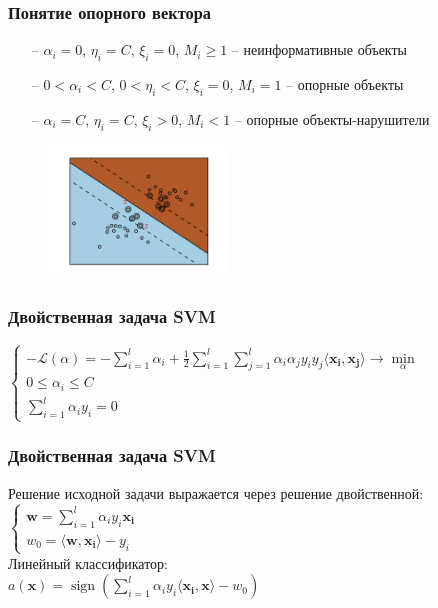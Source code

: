 \documentclass[12pt]{beamer}
\DeclareMathOperator{\sign}{sign}
\begin{document}
\begin{frame}\frametitle{Понятие опорного вектора}
\begin{itemize}
\item[--] $\alpha_i = 0$, $\eta_i = C$, $\xi_i = 0$, $M_i \geq 1$ -- неинформативные объекты
\item[--] $0 < \alpha_i < C$, $0 < \eta_i < C$, $\xi_i = 0$, $M_i = 1$ -- опорные объекты
\item[--] $\alpha_i = C$, $\eta_i = C$, $\xi_i > 0$, $M_i < 1$ -- опорные объекты-нарушители
\end{itemize}

\begin{figure}[htbp]
  \includegraphics[height=100pt, keepaspectratio = true]{images/classification}   
\end{figure}

\end{frame}


\begin{frame}\frametitle{Двойственная задача SVM}
$\begin{cases}
-\mathcal{L}(\alpha) = - \sum\limits_{i = 1}^l \alpha_i  + \frac{1}{2} \sum\limits_{i = 1}^l\sum\limits_{j = 1}^l \alpha_i \alpha_j y_iy_j \langle \mathbf{x_i}, \mathbf{x_j} \rangle \rightarrow \min\limits_{\alpha}\\
0 \leq \alpha_i \leq C\\
\sum\limits_{i=1}^l \alpha_iy_i = 0
\end{cases}$\\
\end{frame}

\begin{frame}\frametitle{Двойственная задача SVM}

Решение исходной задачи выражается через решение двойственной:\\
$\begin{cases}
\mathbf{w} = \sum\limits_{i = 1}^l \alpha_iy_i\mathbf{x_i}\\
w_0 = \langle \mathbf{w}, \mathbf{x_i} \rangle - y_i
\end{cases}$\\
\vspace{5mm}
Линейный классификатор:\\
$a(\mathbf{x}) = \sign(\sum\limits_{i=1}^l \alpha_iy_i \langle \mathbf{x_i}, \mathbf{x} \rangle - w_0)$

\end{frame}
\end{document}
